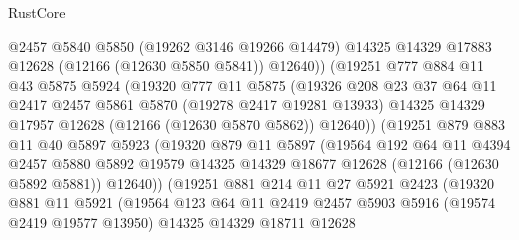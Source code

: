 \begin{lexlean}{RustCore}
\begin{coremodule}
                    @2457
                    @5840
                    @5850
                    (@19262 @3146 @19266 @14479)
                    @14325
                    @14329
                    @17883
                    @12628
                    (@12166 (@12630 @5850 @5841))
                    @12640))
                (@19251
                  @777
                  @884
                  @11
                  @43
                  @5875
                  @5924
                  (@19320
                    @777
                    @11
                    @5875
                    (@19326
                      @208
                      @23
                      @37
                      @64
                      @11
                      @2417
                      @2457
                      @5861
                      @5870
                      (@19278 @2417 @19281 @13933)
                      @14325
                      @14329
                      @17957
                      @12628
                      (@12166 (@12630 @5870 @5862))
                      @12640))
                  (@19251
                    @879
                    @883
                    @11
                    @40
                    @5897
                    @5923
                    (@19320
                      @879
                      @11
                      @5897
                      (@19564
                        @192
                        @64
                        @11
                        @4394
                        @2457
                        @5880
                        @5892
                        @19579
                        @14325
                        @14329
                        @18677
                        @12628
                        (@12166 (@12630 @5892 @5881))
                        @12640))
                    (@19251
                      @881
                      @214
                      @11
                      @27
                      @5921
                      @2423
                      (@19320
                        @881
                        @11
                        @5921
                        (@19564
                          @123
                          @64
                          @11
                          @2419
                          @2457
                          @5903
                          @5916
                          (@19574 @2419 @19577 @13950)
                          @14325
                          @14329
                          @18711
                          @12628

\end{coremodule}
\end{lexlean}

